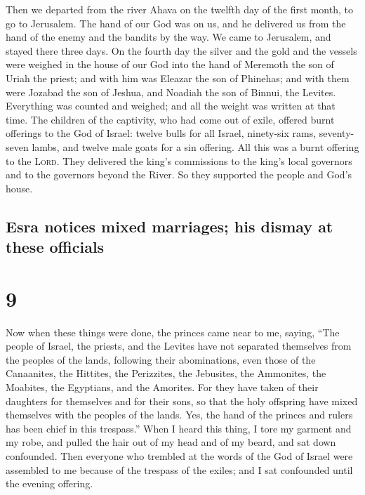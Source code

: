  Then we departed from the river Ahava on the twelfth day
of the first month, to go to Jerusalem. The hand of our God was on us,
and he delivered us from the hand of the enemy and the bandits by the
way.  We came to Jerusalem, and stayed there three days.
 On the fourth day the silver and the gold and the
vessels were weighed in the house of our God into the hand of Meremoth
the son of Uriah the priest; and with him was Eleazar the son of
Phinehas; and with them were Jozabad the son of Jeshua, and Noadiah the
son of Binnui, the Levites.  Everything was counted and
weighed; and all the weight was written at that time. 
The children of the captivity, who had come out of exile, offered burnt
offerings to the God of Israel: twelve bulls for all Israel, ninety-six
rams, seventy-seven lambs, and twelve male goats for a sin offering. All
this was a burnt offering to the \textsc{Lord}.  They
delivered the king's commissions to the king's local governors and to
the governors beyond the River. So they supported the people and God's
house.

\hypertarget{esra-notices-mixed-marriages-his-dismay-at-these-officials}{%
\subsection{Esra notices mixed marriages; his dismay at these
officials}\label{esra-notices-mixed-marriages-his-dismay-at-these-officials}}

\hypertarget{section-8}{%
\section{9}\label{section-8}}

 Now when these things were done, the princes came near to
me, saying, ``The people of Israel, the priests, and the Levites have
not separated themselves from the peoples of the lands, following their
abominations, even those of the Canaanites, the Hittites, the
Perizzites, the Jebusites, the Ammonites, the Moabites, the Egyptians,
and the Amorites.  For they have taken of their daughters
for themselves and for their sons, so that the holy offspring have mixed
themselves with the peoples of the lands. Yes, the hand of the princes
and rulers has been chief in this trespass.''  When I
heard this thing, I tore my garment and my robe, and pulled the hair out
of my head and of my beard, and sat down confounded.  Then
everyone who trembled at the words of the God of Israel were assembled
to me because of the trespass of the exiles; and I sat confounded until
the evening offering.

